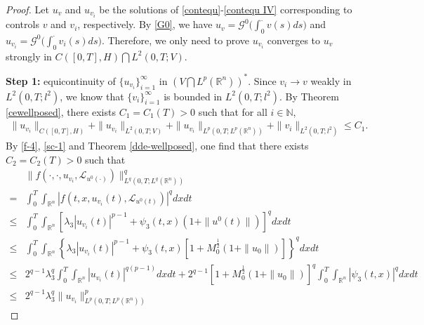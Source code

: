 \documentclass[11pt]{article}
\numberwithin{equation}{section}
\theoremstyle{plain}
\def\leq{\leqslant}
\begin{document}
 \begin{proof}
    Let  $u_v$ and $u_{v_i}$
    be the solutions of \eqref{contequ}-\eqref{contequ IV} corresponding to
    controls $v$ and $v_i$, respectively.
    By \eqref{G0}, we   have
    $u_v = \mathcal{G}^0 \big( \int_0^\cdot v(s) ds \big)$
    and
    $u_{v_i} = \mathcal{G}^0 \big( \int_0^\cdot v_i(s) ds \big)$.
    Therefore, we only need to  prove $u_{v_i}$ converges to $u_v$ strongly in $C([0,T], H) \bigcap L^2(0,T; V)$.

    {\bf Step 1:}   equicontinuity of $\{ u_{v_i} \}_{i=1}^\infty$
    in $\left( V \bigcap L^p(\mathbb{R}^n) \right)^\ast$.
    Since $v_i \rightarrow v$ weakly in $L^2(0, T; l^2)$,
    we know  that $\{ v_i \}_{i=1}^\infty$ is bounded in $L^2(0,T; l^2)$.
    By Theorem \ref{cewellposed}, there exists $C_1 = C_1(T) > 0$ such
    that for all $i \in \mathbb{N}$,
    \begin{align}\label{sc-1}
        \| u_{v_i} \|_{C([0,T],H)}
        + \| u_{v_i} \|_{L^2(0,T; V)}
        + \| u_{v_i} \|_{L^p(0,T;L^p(\mathbb{R}^n))}
        + \| v_i \|_{L^2(0,T; l^2)}
        \leq C_1.
    \end{align}
    By \eqref{f-4},
    \eqref{sc-1} and Theorem \ref{dde-wellposed},
    one
    find that there exists $C_2 = C_2(T) > 0$ such that
    \begin{align} \label{sc-2}
        & \| f(\cdot, \cdot, u_{v_i}, \mathcal{L}_{u^0(\cdot)} ) \|_{L^q(0,T;L^q(\mathbb{R}^n) ) }^q
        \nonumber \\
        = & \int_0^T \int_{\mathbb{R}^n}
        \left| f(t,x, u_{v_i}(t), \mathcal{L}_{u^0(t)} )
        \right|^q dx dt
        \nonumber \\
        \leq & \int_0^T \int_{\mathbb{R}^n}
        \left[ \lambda_3 |u_{v_i}(t)|^{p-1} + \psi_3(t,x) \left( 1 + \|u^0(t)\| \right)
        \right]^q dx dt
        \nonumber \\
        \leq & \int_0^T \int_{\mathbb{R}^n}
        \left\{ \lambda_3 |u_{v_i}(t)|^{p-1}
        + \psi_3(t,x)
        \left[ 1 + M_0^{\frac 12} (1 + \|u_0\|)
        \right]
        \right\}^q dx dt
        \nonumber \\
        \leq & 2^{q-1} \lambda_3^q
        \int_0^T \int_{\mathbb{R}^n} |u_{v_i}(t)|^{q(p-1)} dx dt
        + 2^{q-1}
        \left[ 1 + M_0^{\frac 12}(1 + \|u_0\|)
        \right]^q
        \int_0^T \int_{\mathbb{R}^n} |\psi_3(t,x)|^q dx dt
        \nonumber \\
        \leq & 2^{q-1} \lambda_3^q \|u_{v_i}\|_{L^p(0,T;L^p(\mathbb{R}^n) ) }^p

\end{align}
\end{proof}
\end{document}
